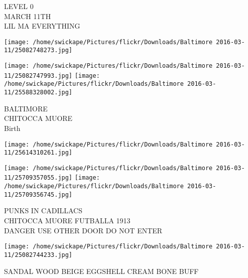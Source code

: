 \documentclass[10pt,letterpaper]{article}
\begin{document}
LEVEL 0\\
MARCH 11TH\\
LIL MA EVERYTHING
\pagebreak

\texttt{[image: /home/swickape/Pictures/flickr/Downloads/Baltimore 2016-03-11/25082748273.jpg]}

\vspace{0.25in}
\texttt{[image: /home/swickape/Pictures/flickr/Downloads/Baltimore 2016-03-11/25082747993.jpg]}
\texttt{[image: /home/swickape/Pictures/flickr/Downloads/Baltimore 2016-03-11/25588328002.jpg]}

BALTIMORE\\
CHITOCCA MUORE\\
Birth
\pagebreak

\texttt{[image: /home/swickape/Pictures/flickr/Downloads/Baltimore 2016-03-11/25614310261.jpg]}

\vspace{0.25in}
\texttt{[image: /home/swickape/Pictures/flickr/Downloads/Baltimore 2016-03-11/25709357055.jpg]}
\texttt{[image: /home/swickape/Pictures/flickr/Downloads/Baltimore 2016-03-11/25709356745.jpg]}

PUNKS IN CADILLACS\\
CHITOCCA MUORE FUTBALLA 1913\\
DANGER USE OTHER DOOR DO NOT ENTER
\pagebreak

\texttt{[image: /home/swickape/Pictures/flickr/Downloads/Baltimore 2016-03-11/25082744233.jpg]}

SANDAL WOOD BEIGE EGGSHELL CREAM BONE BUFF
\pagebreak
\end{document}
